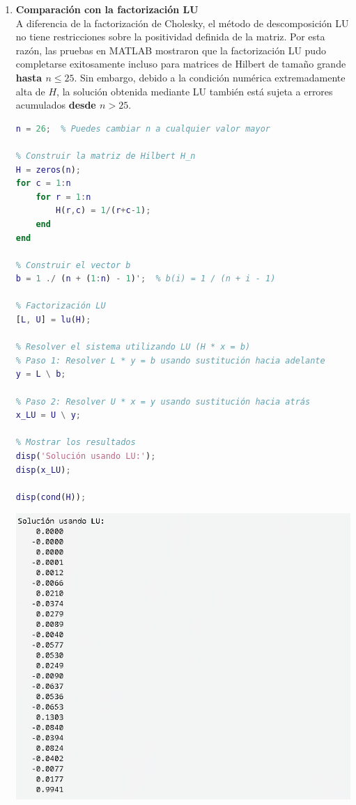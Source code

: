 \begin{homeworkProblem}
\begin{solucion}
\begin{enumerate}[a)]
\begin{enumerate}[1)]
            \item\textbf{ Comparación con la factorización LU} \\ 
              A diferencia de la factorización de Cholesky, el método de descomposición LU no tiene restricciones sobre la positividad definida de la matriz. Por esta razón, las pruebas en MATLAB mostraron que la factorización LU pudo completarse exitosamente incluso para matrices de Hilbert de tamaño grande \textbf{hasta $n\leq 25$}. Sin embargo, debido a la condición numérica extremadamente alta de \( H \), la solución obtenida mediante LU también está sujeta a errores acumulados \textbf{desde $n>25$}.\\
              \begin{lstlisting}[language=matlab]
% Parámetro de tamaño
n = 26;  % Puedes cambiar n a cualquier valor mayor

% Construir la matriz de Hilbert H_n
H = zeros(n);
for c = 1:n
    for r = 1:n
        H(r,c) = 1/(r+c-1);
    end
end

% Construir el vector b
b = 1 ./ (n + (1:n) - 1)';  % b(i) = 1 / (n + i - 1)

% Factorización LU
[L, U] = lu(H);

% Resolver el sistema utilizando LU (H * x = b)
% Paso 1: Resolver L * y = b usando sustitución hacia adelante
y = L \ b;

% Paso 2: Resolver U * x = y usando sustitución hacia atrás
x_LU = U \ y;

% Mostrar los resultados
disp('Solución usando LU:');
disp(x_LU);

disp(cond(H));
              \end{lstlisting}
              \begin{center}
                \includegraphics[scale=0.8]{lu_solution.png}  
              \end{center}
          \end{enumerate}
        \end{enumerate}         
  \end{solucion}
\end{homeworkProblem}
